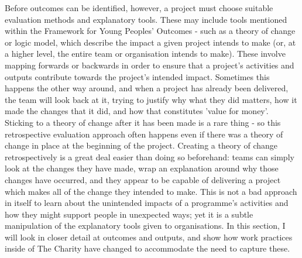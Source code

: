 Before outcomes can be identified, however, a project must choose suitable evaluation methods and explanatory tools. These may include tools mentioned within the Framework for Young Peoples' Outcomes - such as a theory of change or logic model, which describe the impact a given project intends to make (or, at a higher level, the entire team or organisation intends to make). These involve mapping forwards or backwards in order to ensure that a project's activities and outputs contribute towards the project's intended impact. Sometimes this happens the other way around, and when a project has already been delivered, the team will look back at it, trying to justify why what they did matters, how it made the changes that it did, and how that constitutes 'value for money'. Sticking to a theory of change after it has been made is a rare thing - so this retrospective evaluation approach often happens even if there was a theory of change in place at the beginning of the project. Creating a theory of change retrospectively is a great deal easier than doing so beforehand: teams can simply look at the changes they have made, wrap an explanation around why those changes have occurred, and they appear to be capable of delivering a project which makes all of the change they intended to make. This is not a bad approach in itself to learn about the unintended impacts of a programme's activities and how they might support people in unexpected ways; yet it is a subtle manipulation of the explanatory tools given to organisations. In this section, I will look in closer detail at outcomes and outputs, and show how work practices inside of The Charity have changed to accommodate the need to capture these.

